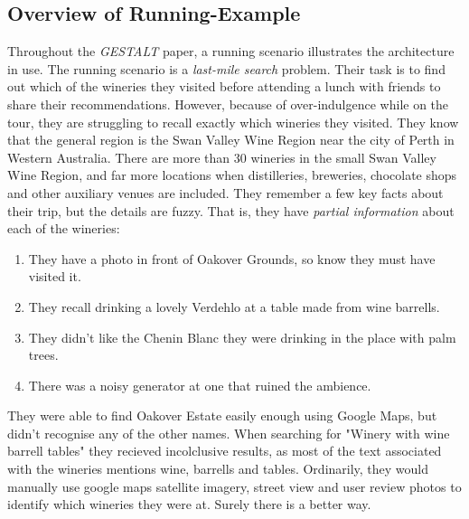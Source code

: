 \subsection{Overview of Running-Example}
Throughout the \textit{GESTALT} paper, a running scenario illustrates the architecture in use. 
The running scenario is a \textit{last-mile search} problem. Their task is to find out which of the wineries they visited before attending a lunch with friends to share their recommendations. 
However, because of over-indulgence while on the tour, they are struggling to recall exactly which wineries they visited.
They know that the general region is the Swan Valley Wine Region near the city of Perth in Western Australia. There are more than 30 wineries in the small Swan Valley Wine Region, and far more locations when distilleries, breweries, chocolate shops and other auxiliary venues are included. 
They remember a few key facts about their trip, but the details are fuzzy. That is, they have \textit{partial information} about each of the wineries:
\begin{enumerate}
	\item They have a photo in front of Oakover Grounds, so know they must have visited it. 
	\item They recall drinking a lovely Verdehlo at a table made from wine barrells. 
	\item They didn't like the Chenin Blanc they were drinking in the place with palm trees.
	\item There was a noisy generator at one that ruined the ambience. 
\end{enumerate}	
They were able to find Oakover Estate easily enough using Google Maps, but didn't recognise any of the other names. 
When searching for "Winery with wine barrell tables" they recieved incolclusive results, as most of the text associated with the wineries mentions wine, barrells and tables. 
Ordinarily, they would manually use google maps satellite imagery, street view and user review photos to identify which wineries they were at. 
Surely there is a better way.

